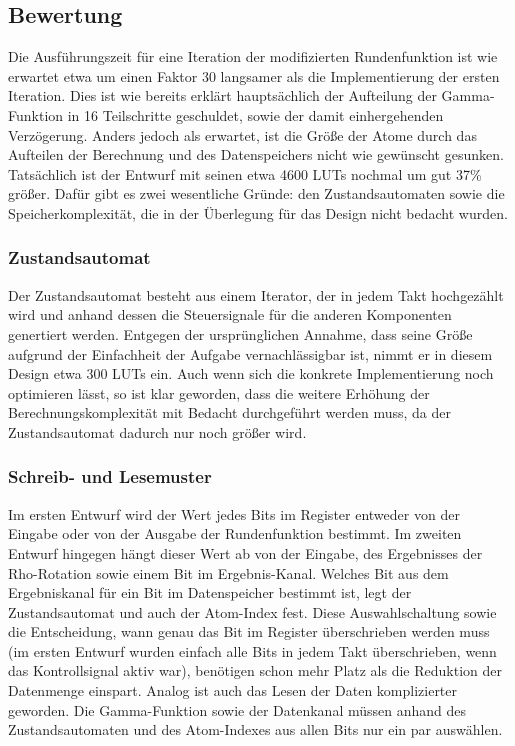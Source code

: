 \subsection{Bewertung}
Die Ausführungszeit für eine Iteration der modifizierten Rundenfunktion ist wie erwartet etwa um einen Faktor 30 langsamer als die Implementierung der ersten Iteration.
Dies ist wie bereits erklärt hauptsächlich der Aufteilung der Gamma-Funktion in 16 Teilschritte geschuldet, sowie der damit einhergehenden Verzögerung.
Anders jedoch als erwartet, ist die Größe der Atome durch das Aufteilen der Berechnung und des Datenspeichers nicht wie gewünscht gesunken.
Tatsächlich ist der Entwurf mit seinen etwa 4600 LUTs nochmal um gut 37\% größer. Dafür gibt es zwei wesentliche Gründe: den Zustandsautomaten sowie die Speicherkomplexität,
die in der Überlegung für das Design nicht bedacht wurden.
\subsubsection{Zustandsautomat}
Der Zustandsautomat besteht aus einem Iterator, der in jedem Takt hochgezählt wird und anhand dessen die Steuersignale für die anderen Komponenten genertiert werden.
Entgegen der ursprünglichen Annahme, dass seine Größe aufgrund der Einfachheit der Aufgabe vernachlässigbar ist, nimmt er in diesem Design etwa 300 LUTs ein.
Auch wenn sich die konkrete Implementierung noch optimieren lässt, so ist klar geworden, dass die weitere Erhöhung der Berechnungskomplexität mit Bedacht durchgeführt werden muss,
da der Zustandsautomat dadurch nur noch größer wird.
\subsubsection{Schreib- und Lesemuster}
Im ersten Entwurf wird der Wert jedes Bits im Register entweder von der Eingabe oder von der Ausgabe der Rundenfunktion bestimmt.
Im zweiten Entwurf hingegen hängt dieser Wert ab von der Eingabe, des Ergebnisses der Rho-Rotation sowie einem Bit im Ergebnis-Kanal.
Welches Bit aus dem Ergebniskanal für ein Bit im Datenspeicher bestimmt ist, legt der Zustandsautomat und auch der Atom-Index fest.
Diese Auswahlschaltung sowie die Entscheidung, wann genau das Bit im Register überschrieben werden muss (im ersten Entwurf wurden einfach alle Bits in jedem Takt überschrieben, wenn das Kontrollsignal aktiv war),
benötigen schon mehr Platz als die Reduktion der Datenmenge einspart.
Analog ist auch das Lesen der Daten komplizierter geworden. Die Gamma-Funktion sowie der Datenkanal müssen anhand des Zustandsautomaten und des Atom-Indexes aus allen Bits nur ein par auswählen.
